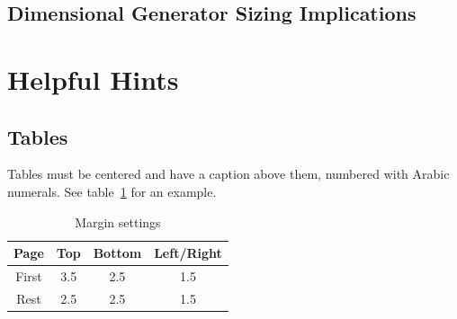 \documentclass{ifacconf}
\begin{document}
\subsection{Dimensional Generator Sizing Implications}



\section{Helpful Hints}
\subsection{Tables}
Tables must be centered and have a caption above them, numbered with
Arabic numerals. See table~\ref{tb:margins} for an example.

\begin{table}[hb]
\begin{center}
\caption{Margin settings}\label{tb:margins}
\begin{tabular}{cccc}
Page & Top & Bottom & Left/Right \\\hline
First & 3.5 & 2.5 & 1.5 \\
Rest & 2.5 & 2.5 & 1.5 \\ \hline
\end{tabular}
\end{center}
\end{table}
\end{document}
